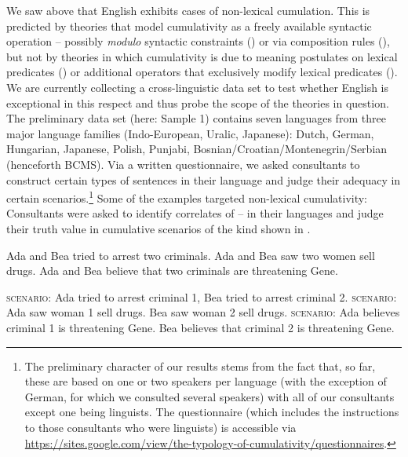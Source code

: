 \documentclass[output=paper]{langscibook}
\begin{document}
We saw above that English exhibits cases of non-lexical cumulation. This is predicted by theories that model cumulativity as a freely  available
 syntactic operation -- possibly \textit{modulo} syntactic constraints () or via composition rules (), but not by theories in which cumulativity is due to meaning postulates on lexical predicates () or additional operators that exclusively modify lexical predicates (). We are currently collecting a cross-linguistic data set to test whether English is exceptional in this respect and thus probe the scope of the theories in question. The preliminary data set (here: Sample 1) contains seven languages from three major language families (Indo-European, Uralic, Japanese): 
Dutch, German, Hungarian, Japanese, Polish, Punjabi, Bosnian/Croatian/Montenegrin/\-Serbian (henceforth BCMS). 
Via a written questionnaire, we asked consultants to construct certain types of sentences in their language and judge their adequacy in certain scenarios.\footnote{The preliminary character of our results stems from the fact that, so far, these are based on one or two speakers per  language (with the exception of German, for which we consulted several speakers) with all of our consultants except one being linguists. The questionnaire (which includes the instructions to those consultants who were linguists) is accessible via \url{https://sites.google.com/view/the-typology-of-cumulativity/questionnaires}.} Some of the examples targeted non-lexical cumulativity: Consultants were asked to identify correlates of -- in their languages and judge their truth value in cumulative scenarios of the kind shown in .

\ea\label{has-sch:questi}
\ea \label{has-sch:questi-b}  Ada and Bea tried to arrest two criminals.
\ex \label{has-sch:questi-c}  Ada and Bea saw two women sell drugs.
\ex \label{has-sch:questi-d}  Ada and Bea believe that two criminals are threatening Gene. 
\z\z

\ea\label{has-sch:sceni}
\ea \textsc{scenario}: Ada tried to arrest criminal 1, Bea tried to arrest criminal 2.\label{has-sch:sceni-b} 
\ex \textsc{scenario}: Ada saw woman 1 sell drugs. Bea saw woman 2 sell drugs. \label{has-sch:sceni-c} 
\ex  \textsc{scenario}: Ada believes criminal 1 is threatening Gene. Bea believes that criminal 2 is threatening Gene. \label{has-sch:sceni-d} 
\z\z
\end{document}
